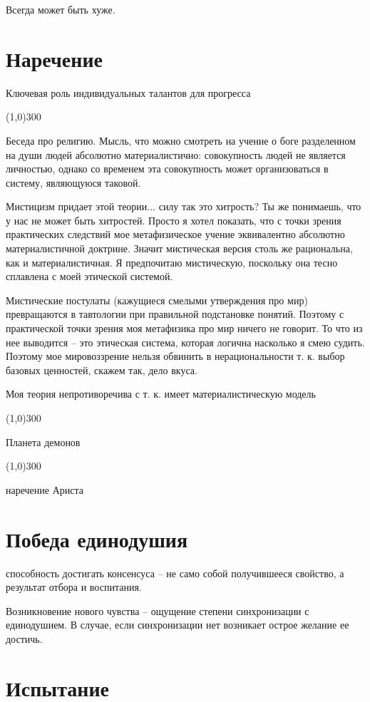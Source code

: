 \documentclass[12pt,a4paper]{article}
\newcommand{\sep}{
	\begin{center}
		\line(1,0){300}
	\end{center}
}
\begin{document}
Всегда может быть хуже.

\section*{Наречение}
Ключевая роль индивидуальных талантов для прогресса

\sep

Беседа про религию. Мысль, что можно смотреть на учение о боге разделенном на души людей абсолютно материалистично: совокупность людей не является личностью, однако со временем эта совокупность может организоваться в систему, являющуюся таковой.

Мистицизм придает этой теории... силу
так это хитрость?
Ты же понимаешь, что у нас не может быть хитростей. Просто я хотел показать, что с точки зрения практических следствий мое метафизическое учение эквивалентно абсолютно материалистичной доктрине. Значит мистическая версия столь же рациональна, как и материалистичная. Я предпочитаю мистическую, поскольку она тесно сплавлена с моей этической системой.

Мистические постулаты (кажущиеся смелыми утверждения про мир) превращаются в тавтологии при правильной подстановке понятий. Поэтому с практической точки зрения моя метафизика про мир ничего не говорит. То что из нее выводится -- это этическая система, которая логична насколько я смею судить. Поэтому мое мировоззрение нельзя обвинить в нерациональности т. к. выбор базовых ценностей, скажем так, дело вкуса.

Моя теория непротиворечива с т. к. имеет материалистическую модель
\sep

Планета демонов

\sep

наречение Ариста

\section*{Победа единодушия}

способность достигать консенсуса -- не само собой получившееся свойство, а результат отбора и воспитания.

Возникновение нового чувства -- ощущение степени синхронизации с единодушием. В случае, если синхронизации нет возникает острое желание ее достичь.

\section*{Испытание}
\end{document}
